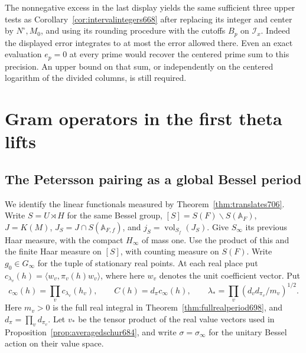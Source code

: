 \documentclass[a4paper,11pt]{article}
\theoremstyle{definition}
\theoremstyle{remark}
\numberwithin{equation}{section}
\begin{document}
The nonnegative excess in the last display yields the same
sufficient three upper tests as Corollary~\ref{cor:intervalintegers668}
after replacing its integer and center by \(N^\circ,M_0\),
and using its rounding procedure with the cutoffs \(B_p\) on
\(\mathcal I_x\). Indeed the displayed error integrates to at
most the error allowed there. Even an exact evaluation \(e_p=0\)
at every prime would recover the centered prime sum to this
precision. An upper bound on that sum, or independently on the
centered logarithm of the divided columns, is still required.

\section{Gram operators in the first theta lifts}\label{nav:theta-gram}

\subsection{The Petersson pairing as a global Bessel period}
\label{sec:globalbessel707}

We identify the linear functionals measured by
Theorem~\ref{thm:translates706}. Write \(S=U\rtimes H\) for
the same Bessel group, \([S]=S(F)\backslash S(\mathbb A_F)\),
\(J=K(M)\), \(J_S=J\cap S(\mathbb A_{F,f})\), and
\(j_S=\operatorname{vol}_{S_f}(J_S)\). Give \(S_\infty\)
its previous Haar measure, with the compact \(H_\infty\)
of mass one. Use the product of this and the finite Haar
measure on \([S]\), with counting measure on \(S(F)\).
Write \(g_0\in G_\infty\) for the tuple of stationary real
points. At each real place put \(c_{\lambda_v}(h)=
\langle w_v,\pi_v(h)w_v\rangle\), where here \(w_v\) denotes
the unit coefficient vector. Put
\[
 c_\infty(h)=\prod_v c_{\lambda_v}(h_v),\qquad
 C(h)=d_\pi c_\infty(h),\qquad
 \lambda_*=\prod_v(d_v d_{\pi_v}/m_v)^{1/2}.
\]
Here \(m_v>0\) is the full real integral in
Theorem~\ref{thm:fullrealperiod698}, and \(d_\pi=\prod_v d_{\pi_v}\).
Let \(v_*\) be the tensor product of the real value vectors
used in Proposition~\ref{prop:averagedschur684}, and write
\(\sigma=\sigma_\infty\) for the unitary Bessel action on
their value space.
\end{document}
